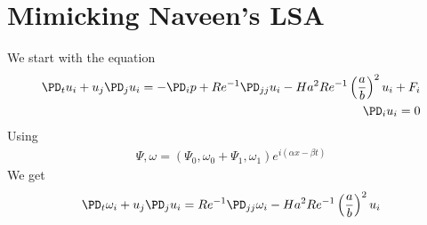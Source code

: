 \documentclass[11pt]{article}
\begin{document}
\doublespacing
\MOONSTITLE
\maketitle

\section{Mimicking Naveen's LSA}
We start with the equation
\begin{equation}\begin{aligned}
\PD_t u_i + u_j \PD_j u_i = -\PD_i p + Re^{-1} \PD_{jj} u_i - Ha^2 Re^{-1} \left( \frac{a}{b} \right)^2 u_i + F_i \\
\PD_i u_i = 0
\end{aligned}\end{equation}
Using
\begin{equation}\begin{aligned}
\Psi,\omega = (\Psi_0,\omega_0 + \Psi_1,\omega_1) e^{i(\alpha x - \beta t)}
\end{aligned}\end{equation}
We get
\begin{equation}\begin{aligned}
\PD_t \omega_i + u_j \PD_j u_i = Re^{-1} \PD_{jj} \omega_i - Ha^2 Re^{-1} \left( \frac{a}{b} \right)^2 u_i \\
\end{aligned}\end{equation}
\end{document}
